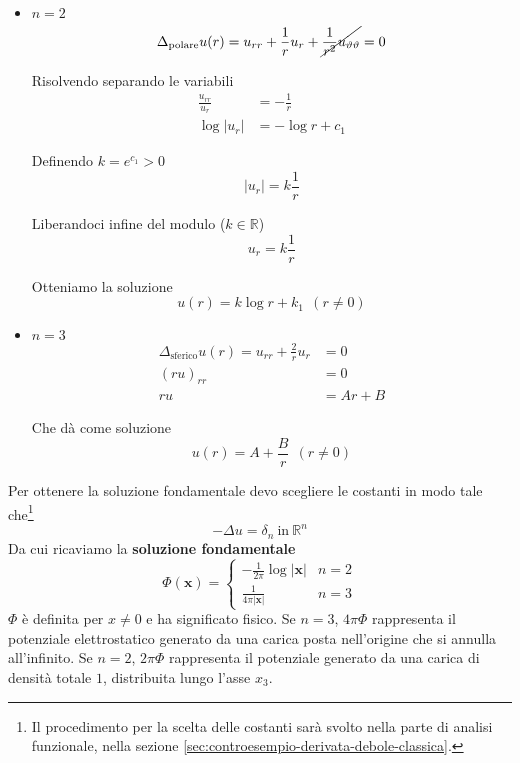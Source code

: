 \documentclass[10pt,a4paper,twoside,openright]{book}
\newcommand{\x}{\mathbf{x}}
\begin{document}
\begin{itemize}
	\item $n=2$
	\begin{equation*}
	      \Delta _{\text{polare}} u(r) =u_{rr} +\frac{1}{r} u_{r} +\cancel{\frac{1}{r^{2}} u_{\vartheta \vartheta }} =0
	\end{equation*}
	
	Risolvendo separando le variabili
	\begin{align*}
	\frac{u_{rr}}{u_{r}} & =-\frac{1}{r}\\
	\log| u_{r}|  & =-\log r+c_{1}
	\end{align*}
	
	Definendo $\displaystyle k=e^{c_{1}}  >0$
	\begin{equation*}
	| u_{r}| =k\frac{1}{r}
	\end{equation*}
	
	Liberandoci infine del modulo ($\displaystyle k\in \mathbb{R}$)
	\begin{equation*}
	u_{r} =k\frac{1}{r}
	\end{equation*}
	
	Otteniamo la soluzione
	\begin{equation*}
	\boxed{u(r) =k\log r+k_{1}} \ \ (r\neq 0)
	\end{equation*}
	\item $n=3$
	\begin{align*}
	      \Delta _{\text{sferico}} u(r) =u_{rr} +\frac{2}{r} u_{r} & =0\\
	      (ru)_{rr} & =0\\
	      ru & =Ar+B
	\end{align*}
	
	Che dà come soluzione
	\begin{equation*}
	\boxed{u(r) =A+\frac{B}{r}} \ \ (r\neq 0)
	\end{equation*}
\end{itemize}

Per ottenere la soluzione fondamentale devo scegliere le costanti in modo tale che\footnote{Il procedimento per la scelta delle costanti sarà svolto nella parte di analisi funzionale, nella sezione \ref{sec:controesempio-derivata-debole-classica}.}
\begin{equation*}
	-\Delta u=\delta _{n} \ \text{in} \ \mathbb{R}^{n}
\end{equation*}
Da cui ricaviamo la \textbf{soluzione fondamentale}
\begin{equation}
	\boxed{\Phi (\x) =
	\begin{cases}
	-\frac{1}{2\pi }\log|\x|  & n=2\\
	\frac{1}{4\pi |\x| } & n=3
	\end{cases}}
\end{equation}
$\displaystyle \Phi $ è definita per $\displaystyle x\neq 0$ e ha significato fisico. Se $n=3$, $\displaystyle 4\pi \Phi $ rappresenta il potenziale elettrostatico generato da una carica posta nell'origine che si annulla all'infinito. Se $n=2$, $\displaystyle 2\pi \Phi $ rappresenta il potenziale generato da una carica di densità totale $1$, distribuita lungo l'asse $\displaystyle x_{3}$.
\end{document}
